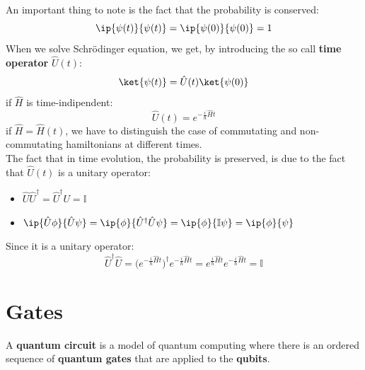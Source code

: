 \noindent An important thing to note is the fact that the probability is conserved:
\begin{equation*}
    \ip{\psi(t)}{\psi(t)}=\ip{\psi(0)}{\psi(0)}=1
\end{equation*}
\noindent When we solve Schrödinger equation, we get, by introducing the so call \textbf{time operator} $\hat U(t)$:
\begin{equation*}
    \ket{\psi(t)}=\hat U(t)\ket{\psi(0)}
\end{equation*}
\noindent if $\hat H$ is time-indipendent:
\begin{equation*}
    \hat U(t) = e^{-\frac{i}{\hbar}\hat H t}
\end{equation*}
\noindent if $\hat H = \hat H(t)$, we have to distinguish the case of commutating and non-commutating hamiltonians at different times.\\
The fact that in time evolution, the probability is preserved, is due to the fact that $\hat U(t)$ is a unitary operator:
\begin{itemize}
    \item $\hat U \hat U^\dagger=\hat U^\dagger U = \mathbb{I}$
    \item $\ip{\hat U\phi}{\hat U\psi}=\ip{\phi}{\hat U^\dagger \hat U\psi}=\ip{\phi}{\mathbb{I}\psi}=\ip{\phi}{\psi}$
\end{itemize}
\noindent Since it is a unitary operator:
\begin{equation*}
    \hat U^\dagger\hat U = \bigg(e^{-\frac i\hbar \hat H t}\bigg)^\dagger e^{-\frac i\hbar \hat H t} = e^{\frac i\hbar \hat H t} e^{-\frac i\hbar \hat H t} = \mathbb{I}
\end{equation*}

\section{Gates}

\begin{definition}
    A \textbf{quantum circuit} is a model of quantum computing where there is an ordered sequence of \textbf{quantum gates} that are applied to the \textbf{qubits}.
\end{definition}

